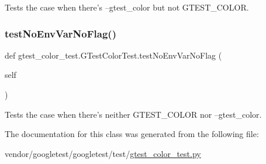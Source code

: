\begin{DoxyVerb}Tests the case when there's --gtest_color but not GTEST_COLOR.\end{DoxyVerb}
 \mbox{\label{classgtest__color__test_1_1_g_test_color_test_a22bf83ab416dc3ccd3c1b771ff74022c}} 
\subsubsection{\texorpdfstring{test\+No\+Env\+Var\+No\+Flag()}{testNoEnvVarNoFlag()}}
{\footnotesize\ttfamily def gtest\+\_\+color\+\_\+test.\+G\+Test\+Color\+Test.\+test\+No\+Env\+Var\+No\+Flag (\begin{DoxyParamCaption}\item[{}]{self }\end{DoxyParamCaption})}

\begin{DoxyVerb}Tests the case when there's neither GTEST_COLOR nor --gtest_color.\end{DoxyVerb}
 

The documentation for this class was generated from the following file\+:\begin{DoxyCompactItemize}
\item 
vendor/googletest/googletest/test/\hyperlink{gtest__color__test_8py}{gtest\+\_\+color\+\_\+test.\+py}\end{DoxyCompactItemize}
